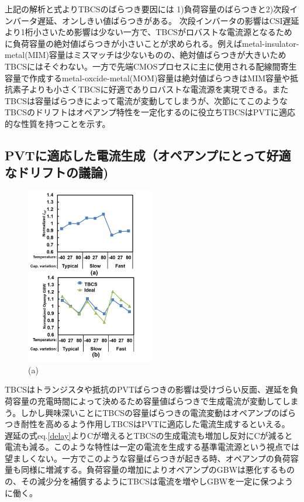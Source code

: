 \documentclass[letterpaper, 10 pt, conference]{ieeeconf}  %
\begin{document}
上記の解析と式よりTBCSのばらつき要因には 1)負荷容量のばらつきと2)次段インバータ遅延、オンしきい値ばらつきがある。
次段インバータの影響はCSI遅延より1桁小さいため影響は少ない一方で、TBCSがロバストな電流源となるために負荷容量の絶対値ばらつきが小さいことが求められる。例えばmetal-insulator-metal(MIM)容量はミスマッチは少ないものの、絶対値ばらつきが大きいためTBCSにはそぐわない。一方で先端CMOSプロセスに主に使用される配線間寄生容量で作成するmetal-oxcide-metal(MOM)容量は絶対値ばらつきはMIM容量や抵抗素子よりも小さくTBCSに好適でありロバストな電流源を実現できる。またTBCSは容量ばらつきによって電流が変動してしまうが、次節にてこのようなTBCSのドリフトはオペアンプ特性を一定化するのに役立ちTBCSはPVTに適応的な性質を持つことを示す。


\subsection{PVTに適応した電流生成（オペアンプにとって好適なドリフトの議論)}
\begin{figure}[!]
\centering
 \includegraphics[width=0.5\textwidth]{figs/iref_var.png}
  \caption{(a) 
}
\label{cvar}
\end{figure}

TBCSはトランジスタや抵抗のPVTばらつきの影響は受けづらい反面、遅延を負荷容量の充電時間によって決めるため容量値ばらつきで生成電流が変動してしまう。しかし興味深いことにTBCSの容量ばらつきの電流変動はオペアンプのばらつき耐性を高めるよう作用しTBCSはPVTに適応した電流生成するといえる。
遅延の式eq.\ref{delay}よりCが増えるとTBCSの生成電流も増加し反対にCが減ると電流も減る。このような特性は一定の電流を生成する基準電流源という視点では望ましくない。一方でこのような容量ばらつきが起きる時、オペアンプの負荷容量も同様に増減する。負荷容量の増加によりオペアンプのGBWは悪化するものの、その減少分を補償するようにTBCSは電流を増やしGBWを一定に保つように働く。
\end{document}
